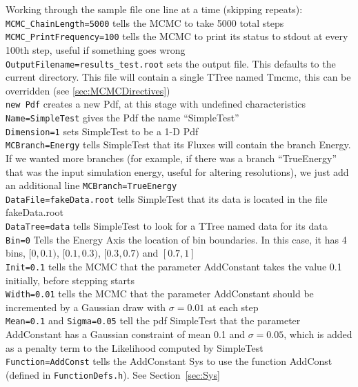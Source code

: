 Working through the sample file one line at a time (skipping
repeats):\medskip\\ 
\verb|MCMC_ChainLength=5000| tells the MCMC to take 5000
total steps\medskip\\ 
\verb|MCMC_PrintFrequency=100| tells the MCMC to print
its status to stdout at every 100th step, useful if something goes
wrong\medskip\\ 
\verb|OutputFilename=results_test.root| sets the output file.
This defaults to the current directory.  This file will
contain a single TTree named Tmcmc, this can be overridden (see
\ref{sec:MCMCDirectives})\medskip\\ 
\verb|new Pdf| creates a new Pdf, at this stage with undefined
characteristics\medskip\\
\verb|Name=SimpleTest| gives the Pdf the name ``SimpleTest''\medskip\\
\verb|Dimension=1| sets SimpleTest to be a 1-D Pdf\medskip\\
\verb|MCBranch=Energy| tells SimpleTest that its Fluxes will contain
the branch Energy.  If we wanted more branches (for example, if there
was a branch ``TrueEnergy'' that was the input simulation energy,
useful for altering resolutions), we just add an additional line
\verb|MCBranch=TrueEnergy|\medskip\\
\verb|DataFile=fakeData.root| tells SimpleTest that its data is
located in the file fakeData.root\medskip\\
\verb|DataTree=data| tells SimpleTest to look for a TTree named data
for its data\medskip\\
\verb|Bin=0| Tells the Energy Axis the location of bin boundaries.  In
this case, it has 4 bins, $[0,0.1)$, $[0.1,0.3)$, $[0.3,0.7)$ and
$[0.7,1]$\medskip\\
\verb|Init=0.1| tells the MCMC that the parameter AddConstant takes the
value 0.1 initially, before stepping starts\medskip\\
\verb|Width=0.01| tells the MCMC that the parameter AddConstant should be
incremented by a Gaussian draw with $\sigma=0.01$ at each step\medskip\\
\verb|Mean=0.1| and \verb|Sigma=0.05| tell the pdf SimpleTest that the
parameter AddConstant has a Gaussian constraint of mean 0.1 and
$\sigma=0.05$, which is added as a penalty term to the Likelihood
computed by SimpleTest\medskip\\
\verb|Function=AddConst| tells the AddConstant Sys to use the function
AddConst (defined in \verb|FunctionDefs.h|).  See \mbox{Section
  \ref{sec:Sys}}

